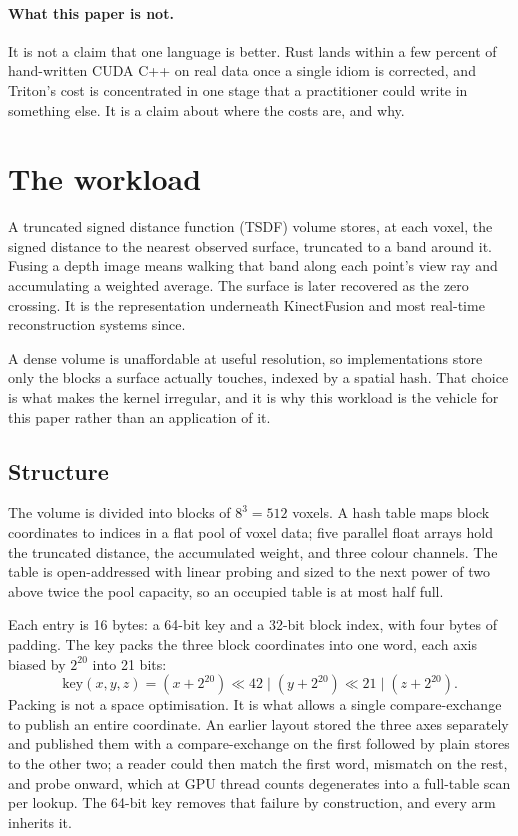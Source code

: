 \documentclass[11pt]{article}
\begin{document}
\paragraph{What this paper is not.} It is not a claim that one language is
better. Rust lands within a few percent of hand-written CUDA C++ on real data
once a single idiom is corrected, and Triton's cost is concentrated in one stage
that a practitioner could write in something else. It is a claim about where the
costs are, and why.

\section{The workload}
\label{sec:workload}

A truncated signed distance function (TSDF) volume stores, at each voxel, the
signed distance to the nearest observed surface, truncated to a band around it.
Fusing a depth image means walking that band along each point's view ray and
accumulating a weighted average. The surface is later recovered as the zero
crossing. It is the representation underneath KinectFusion and most real-time
reconstruction systems since.

A dense volume is unaffordable at useful resolution, so implementations store
only the blocks a surface actually touches, indexed by a spatial hash. That
choice is what makes the kernel irregular, and it is why this workload is the
vehicle for this paper rather than an application of it.

\subsection{Structure}

The volume is divided into blocks of $8^3 = 512$ voxels. A hash table maps block
coordinates to indices in a flat pool of voxel data; five parallel float arrays
hold the truncated distance, the accumulated weight, and three colour channels.
The table is open-addressed with linear probing and sized to the next power of
two above twice the pool capacity, so an occupied table is at most half full.

Each entry is 16 bytes: a 64-bit key and a 32-bit block index, with four bytes
of padding. The key packs the three block coordinates into one word, each axis
biased by $2^{20}$ into 21 bits:
%
\begin{equation*}
\mathrm{key}(x,y,z) = (x + 2^{20}) \ll 42 \;\vert\; (y + 2^{20}) \ll 21 \;\vert\; (z + 2^{20}).
\end{equation*}
%
Packing is not a space optimisation. It is what allows a single compare-exchange
to publish an entire coordinate. An earlier layout stored the three axes
separately and published them with a compare-exchange on the first followed by
plain stores to the other two; a reader could then match the first word,
mismatch on the rest, and probe onward, which at GPU thread counts degenerates
into a full-table scan per lookup. The 64-bit key removes that failure by
construction, and every arm inherits it.
\end{document}
